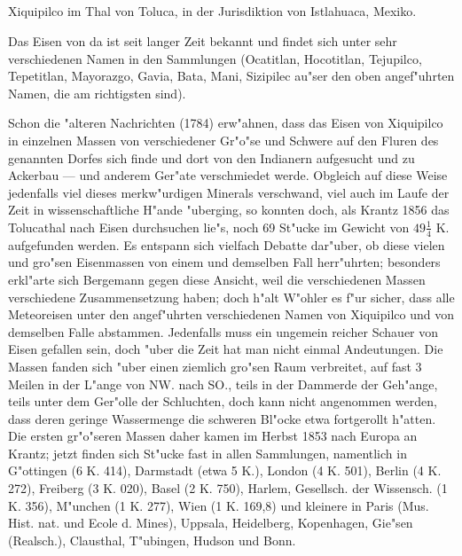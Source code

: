 \documentclass[a4paper, 11pt, oneside]{article}
\begin{document}
\subsection{}
\LARGE
\paragraph{}
Xiquipilco im Thal von Toluca, in der Jurisdiktion von Istlahuaca, Mexiko.

Das Eisen von da ist seit langer Zeit bekannt und findet sich unter sehr verschiedenen Namen in den Sammlungen (Ocatitlan, Hocotitlan, Tejupilco, Tepetitlan, Mayorazgo, Gavia, Bata, Mani, Sizipilec au"ser den oben angef"uhrten Namen, die am richtigsten sind).

Schon die "alteren Nachrichten (1784) erw"ahnen, dass das Eisen von Xiquipilco in einzelnen Massen von verschiedener Gr"o"se und Schwere auf den Fluren des genannten Dorfes sich finde und dort von den Indianern aufgesucht und zu Ackerbau --- und anderem Ger"ate verschmiedet werde. Obgleich auf diese Weise jedenfalls viel dieses merkw"urdigen Minerals verschwand, viel auch im Laufe der Zeit in wissenschaftliche H"ande "uberging, so konnten doch, als Krantz 1856 das Tolucathal nach Eisen durchsuchen lie"s, noch 69 St"ucke im Gewicht von $49\frac{1}{4}$ K. aufgefunden werden. Es entspann sich vielfach Debatte dar"uber, ob diese vielen und gro"sen Eisenmassen von einem und demselben Fall herr"uhrten; besonders erkl"arte sich Bergemann gegen diese Ansicht, weil die verschiedenen Massen verschiedene Zusammensetzung haben; doch h"alt W"ohler es f"ur sicher, dass alle Meteoreisen unter den angef"uhrten verschiedenen Namen von Xiquipilco und von demselben Falle abstammen. Jedenfalls muss ein ungemein reicher Schauer von Eisen gefallen sein, doch "uber die Zeit hat man nicht einmal Andeutungen. Die Massen fanden sich "uber einen ziemlich gro"sen Raum verbreitet, auf fast 3 Meilen in der L"ange von NW. nach SO., teils in der Dammerde der Geh"ange, teils unter dem Ger"olle der Schluchten, doch kann nicht angenommen werden, dass deren geringe Wassermenge die schweren Bl"ocke etwa fortgerollt h"atten. Die ersten gr"o"seren Massen daher kamen im Herbst 1853 nach Europa an Krantz; jetzt finden sich St"ucke fast in allen Sammlungen, namentlich in G"ottingen (6 K. 414), Darmstadt (etwa 5 K.), London (4 K. 501), Berlin (4 K. 272), Freiberg (3 K. 020), Basel (2 K. 750), Harlem, Gesellsch. der Wissensch. (1 K. 356), M"unchen (1 K. 277), Wien (1 K. 169,8) und kleinere in Paris (Mus. Hist. nat. und Ecole d. Mines), Uppsala, Heidelberg, Kopenhagen, Gie"sen (Realsch.), Clausthal, T"ubingen, Hudson und Bonn.
\end{document}
